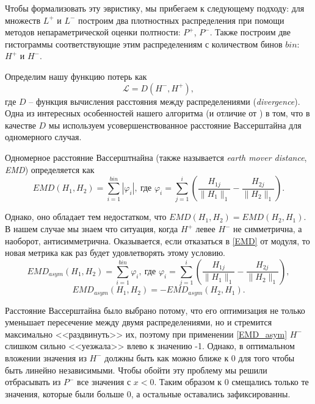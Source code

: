 \documentclass[12pt,a4paper]{extarticle}
\newcommand{\Loss}{\mathcal{L}}
\begin{document}
    Чтобы формализовать эту эвристику, мы прибегаем к следующему подходу: для множеств $L^+$ и $L^-$ построим два плотностных распределения при помощи методов непараметрической оценки полтности: $P^+$, $P^-$. Также построим две гистограммы соответствующие этим распределениям с количеством бинов $bin$: $H^+$ и $H^-$.
    
    Определим нашу функцию потерь как
    \[\Loss = D(H^-, H^+),\]
    где $D$ -- функция вычисления расстояния между распределениями (\textit{divergence}). Одна из интересных особенностей нашего алгоритма (и отличие от \cite{hist_loss}) в том, что в качестве $D$ мы используем усовершенствованное расстояние Вассерштайна \cite{emd} для одномерного случая.
    
    Одномерное расстояние Вассерштнайна (также называется \textit{earth mover distance}, \textit{EMD}) определяется как
    \begin{equation} \label{EMD}
        EMD(H_1, H_2) = \sum_{i=1}^{bin} |\varphi_i|,\ \text{где } \varphi_i = \sum_{j=1}^i \left(\frac{H_{1j}}{\lVert H_1 \rVert_1} - \frac{H_{2j}}{\lVert H_2 \rVert_1} \right).
    \end{equation}
    
    Однако, оно обладает тем недостатком, что $EMD(H_1, H_2) = EMD(H_2, H_1)$.
    В нашем случае мы знаем что ситуация, когда $H^+$ левее $H^-$ не симметрична, а наоборот, антисимметрична. Оказывается, если отказаться в \eqref{EMD} от модуля, то новая метрика как раз будет удовлетворять этому условию.
    \begin{equation} \label{EMD_asym}
        EMD_{asym}(H_1, H_2) = \sum_{i=1}^{bin} \varphi_i,\ \text{где } \varphi_i = \sum_{j=1}^i \left(\frac{H_{1j}}{\lVert H_1 \rVert_1} - \frac{H_{2j}}{\lVert H_2 \rVert_1} \right),
    \end{equation}
    \[EMD_{asym}(H_1, H_2) = - EMD_{asym}(H_2, H_1).\]
    
    Расстояние Вассерштайна было выбрано потому, что его оптимизация не только уменьшает пересечение между двумя распределениями, но и стремится максимально <<раздвинуть>> их, поэтому при применении \eqref{EMD_asym} $H^-$ слишком сильно <<уезжала>> влево к значению -1.
    Однако, в оптимальном вложении значения из $H^-$ должны быть как можно ближе к 0 для того чтобы быть линейно независимыми.
    Чтобы обойти эту проблему мы решили отбрасывать из $P^-$ все значения с $x < 0$.
    Таким образом к 0 смещались только те значения, которые были больше 0, а остальные оставались зафиксированны.
    
\end{document}
